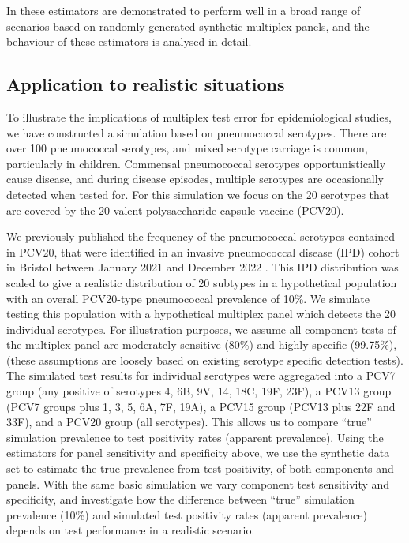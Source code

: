 \documentclass[10pt,letterpaper]{article}
\begin{document}
In  these estimators are demonstrated to perform well in a broad range of scenarios based on randomly generated synthetic multiplex panels, and the behaviour of these estimators is analysed in detail.

\subsection*{Application to realistic situations}

To illustrate the implications of multiplex test error for epidemiological studies, we have constructed a simulation based on pneumococcal serotypes. There are over 100 pneumococcal serotypes, and mixed serotype carriage is common, particularly in children. Commensal pneumococcal serotypes opportunistically cause disease, and during disease episodes, multiple serotypes are occasionally detected when tested for. For this simulation we focus on the 20 serotypes that are covered by the 20-valent polysaccharide capsule vaccine (PCV20).

We previously published the frequency of the pneumococcal serotypes contained in PCV20, that were identified in an invasive pneumococcal disease (IPD) cohort in Bristol between January 2021 and December 2022 \cite{hyams2023}. This IPD distribution was scaled to give a realistic distribution of 20 subtypes in a hypothetical population with an overall PCV20-type pneumococcal prevalence of 10\%. We simulate testing this population with a hypothetical multiplex panel which detects the 20 individual serotypes. For illustration purposes, we assume all component tests of the multiplex panel are moderately sensitive (80\%) and highly specific (99.75\%), (these assumptions are loosely based on existing serotype specific detection tests). The simulated test results for individual serotypes were aggregated into a PCV7 group (any positive of serotypes 4, 6B, 9V, 14, 18C, 19F, 23F), a PCV13 group (PCV7 groups plus 1, 3, 5, 6A, 7F, 19A), a PCV15 group (PCV13 plus 22F and 33F), and a PCV20 group (all serotypes). This allows us to compare ``true'' simulation prevalence to test positivity rates (apparent prevalence). Using the estimators for panel sensitivity and specificity above, we use the synthetic data set to estimate the true prevalence from test positivity, of both components and panels. With the same basic simulation we vary component test sensitivity and specificity, and investigate how the difference between ``true'' simulation prevalence (10\%) and simulated test positivity rates (apparent prevalence) depends on test performance in a realistic scenario.
\end{document}

